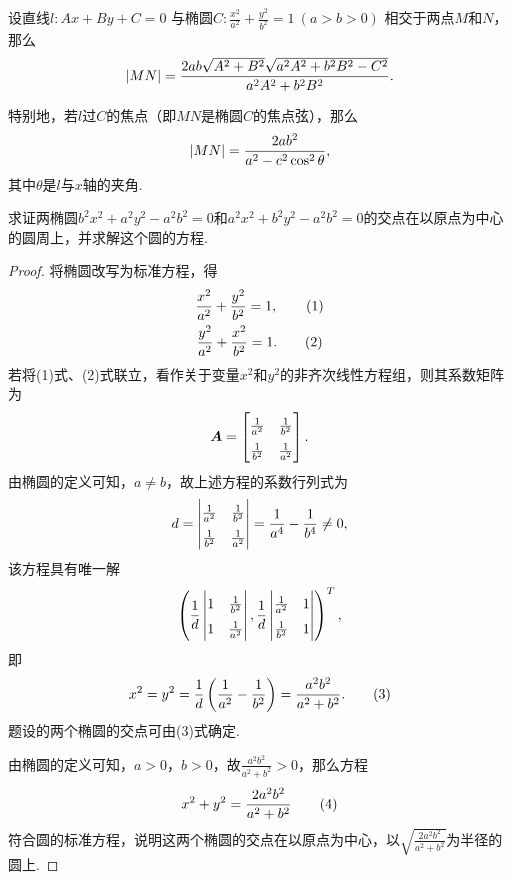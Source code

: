 \begin{theorem}[椭圆的弦长]
设直线\(l: Ax+By+C=0\)
与椭圆\(C: \frac{x^2}{a^2} + \frac{y^2}{b^2} = 1\ (a>b>0)\)
相交于两点\(M\)和\(N\)，那么
\begin{equation}
\abs{MN} = \frac{2ab\sqrt{A^2+B^2}\sqrt{a^2 A^2 + b^2 B^2 - C^2}}{a^2 A^2 + b^2 B^2}.
\end{equation}

特别地，若\(l\)过\(C\)的焦点（即\(MN\)是椭圆\(C\)的焦点弦），那么
\begin{equation}
\abs{MN} = \frac{2ab^2}{a^2 - c^2 \cos^2\theta},
\end{equation}
其中\(\theta\)是\(l\)与\(x\)轴的夹角.
\end{theorem}


\begin{example}
求证两椭圆\(b^2 x^2 + a^2 y^2 - a^2 b^2 = 0\)和\(a^2 x^2 + b^2 y^2 - a^2 b^2 = 0\)的交点在以原点为中心的圆周上，并求解这个圆的方程.
\begin{proof}
将椭圆改写为标准方程，得\begin{gather}
\frac{x^2}{a^2}+\frac{y^2}{b^2}=1, \tag1 \\
\frac{y^2}{a^2}+\frac{x^2}{b^2}=1. \tag2
\end{gather}
若将(1)式、(2)式联立，看作关于变量\(x^2\)和\(y^2\)的非齐次线性方程组，则其系数矩阵为\[
\vb{A} = \def\arraystretch{1.5} \begin{bmatrix}
\frac{1}{a^2} & \frac{1}{b^2} \\
\frac{1}{b^2} & \frac{1}{a^2}
\end{bmatrix}.
\]由椭圆的定义可知，\(a \neq b\)，故上述方程的系数行列式为\[
d = \def\arraystretch{1.5} \begin{vmatrix}
\frac{1}{a^2} & \frac{1}{b^2} \\
\frac{1}{b^2} & \frac{1}{a^2}
\end{vmatrix} = \frac{1}{a^4} - \frac{1}{b^4} \neq 0,
\]该方程具有唯一解\[
\left( \def\arraystretch{1.5}
\frac{1}{d} \begin{vmatrix}
1 & \frac{1}{b^2} \\
1 & \frac{1}{a^2}
\end{vmatrix},
\frac{1}{d} \begin{vmatrix}
\frac{1}{a^2} & 1 \\
\frac{1}{b^2} & 1
\end{vmatrix}
\right)^T,
\]即\begin{gather}
x^2 = y^2 = \frac{1}{d} \left(\frac{1}{a^2} - \frac{1}{b^2}\right)
= \frac{a^2 b^2}{a^2 + b^2}. \tag3
\end{gather}题设的两个椭圆的交点可由(3)式确定.

由椭圆的定义可知，\(a>0\)，\(b>0\)，故\(\frac{a^2 b^2}{a^2 + b^2} > 0\)，那么方程\begin{gather}
x^2 + y^2 = \frac{2 a^2 b^2}{a^2 + b^2} \tag4
\end{gather}符合圆的标准方程，说明这两个椭圆的交点在以原点为中心，以\(\sqrt{\frac{2 a^2 b^2}{a^2 + b^2}}\)为半径的圆上.
\end{proof}
\end{example}

